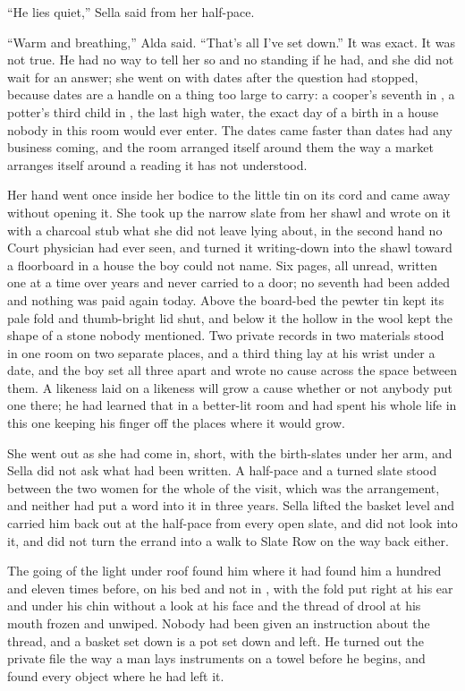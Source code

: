 “He lies quiet,” Sella said from her half-pace.

“Warm and breathing,” Alda said. “That's all I've set down.” It was exact. It was not true. He had no way to tell her so and no standing if he had, and she did not wait for an answer; she went on with dates after the question had stopped, because dates are a handle on a thing too large to carry: a cooper's seventh in , a potter's third child in , the last high water, the exact day of a birth in a house nobody in this room would ever enter. The dates came faster than dates had any business coming, and the room arranged itself around them the way a market arranges itself around a reading it has not understood.

Her hand went once inside her bodice to the little tin on its cord and came away without opening it. She took up the narrow slate from her shawl and wrote on it with a charcoal stub what she did not leave lying about, in the second hand no Court physician had ever seen, and turned it writing-down into the shawl toward a floorboard in a house the boy could not name. Six pages, all unread, written one at a time over years and never carried to a door; no seventh had been added and nothing was paid again today. Above the board-bed the pewter tin kept its pale fold and thumb-bright lid shut, and below it the hollow in the wool kept the shape of a stone nobody mentioned. Two private records in two materials stood in one room on two separate places, and a third thing lay at his wrist under a date, and the boy set all three apart and wrote no cause across the space between them. A likeness laid on a likeness will grow a cause whether or not anybody put one there; he had learned that in a better-lit room and had spent his whole life in this one keeping his finger off the places where it would grow.

She went out as she had come in, short, with the birth-slates under her arm, and Sella did not ask what had been written. A half-pace and a turned slate stood between the two women for the whole of the visit, which was the arrangement, and neither had put a word into it in three years. Sella lifted the basket level and carried him back out at the half-pace from every open slate, and did not look into it, and did not turn the errand into a walk to Slate Row on the way back either.

\scenebreak

The going of the light under  roof found him where it had found him a hundred and eleven times before, on his bed and not in , with the fold put right at his ear and under his chin without a look at his face and the thread of drool at his mouth frozen and unwiped. Nobody had been given an instruction about the thread, and a basket set down is a pot set down and left. He turned out the private file the way a man lays instruments on a towel before he begins, and found every object where he had left it.

